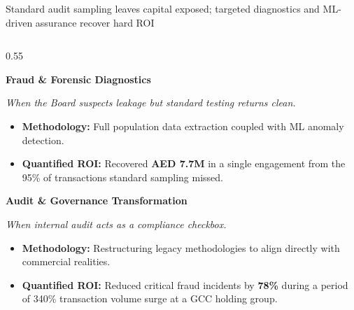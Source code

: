 \documentclass[aspectratio=169, 8pt]{beamer} %
\begin{document}
\begin{frame}{Standard audit sampling leaves capital exposed; targeted diagnostics and ML-driven assurance recover hard ROI}
    \begin{columns}[T]
        \begin{column}{0.55\textwidth}
            \begin{tcolorbox}[colback=bcgLightGray, colframe=bcgLightGray, arc=0pt, left=2pt, top=1pt, bottom=1pt]
                \textbf{\small \color{bcgGreen} Fraud \& Forensic Diagnostics}
            \end{tcolorbox}
            \textit{\scriptsize \color{gray} When the Board suspects leakage but standard testing returns clean.}
            \begin{itemize}
                \setlength{\itemsep}{1pt}
                \setlength{\parskip}{0pt}
                \item \textbf{Methodology:} Full population data extraction coupled with ML anomaly detection.
                \item \textbf{\color{bcgGreen} Quantified ROI:} Recovered \textbf{AED 7.7M} in a single engagement from the 95\% of transactions standard sampling missed.
            \end{itemize}
            
            \vspace{0.1cm}
            \begin{tcolorbox}[colback=bcgLightGray, colframe=bcgLightGray, arc=0pt, left=2pt, top=1pt, bottom=1pt]
                \textbf{\small \color{bcgGreen} Audit \& Governance Transformation}
            \end{tcolorbox}
            \textit{\scriptsize \color{gray} When internal audit acts as a compliance checkbox.}
            \begin{itemize}
                \setlength{\itemsep}{1pt}
                \setlength{\parskip}{0pt}
                \item \textbf{Methodology:} Restructuring legacy methodologies to align directly with commercial realities.
                \item \textbf{\color{bcgGreen} Quantified ROI:} Reduced critical fraud incidents by \textbf{78\%} during a period of 340\% transaction volume surge at a GCC holding group.
            \end{itemize}
        \end{column}
        

\end{columns}
\end{frame}
\end{document}
